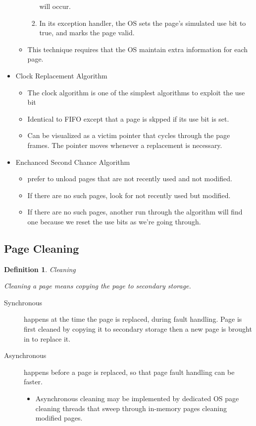 \documentclass[12pt]{article}
\newtheorem{defn}{Definition}[subsection]
\begin{document}
\begin{itemize}
\begin{itemize}
\begin{enumerate}
						will occur.
					\item In its exception handler, the OS sets the page's
						simulated use bit to true, and marks the page valid.
				\end{enumerate}
			\item This technique requires that the OS maintain extra information
				for each page.
		\end{itemize}
	\item Clock Replacement Algorithm
		\begin{itemize}
			\item The clock algorithm is one of the simplest algorithms to
				exploit the use bit
			\item Identical to FIFO except that a page is skpped if its use bit
				is set.
			\item Can be visualized as a victim pointer that cycles through the
				page frames. The pointer moves whenever a replacement is
				necessary.
		\end{itemize}
	\item Enchanced Second Chance Algorithm
		\begin{itemize}
			\item prefer to unload pages that are not recently used and not
				modified.
			\item If there are no such pages, look for not recently used but
				modified.
			\item If there are no such pages, another run through the algorithm
				will find one because we reset the use bits as we're going
				through.
		\end{itemize}
\end{itemize}

\subsection{Page Cleaning}

\begin{defn}{Cleaning}

	Cleaning a page means copying the page to secondary storage.

\end{defn}

\begin{description}
	\item[Synchronous] happens at the time the page is replaced, during fault
		handling. Page is first cleaned by copying it to secondary storage then
		a new page is brought in to replace it.
	\item[Asynchronous] happens before a page is replaced, so that page fault
		handling can be faster.
		\begin{itemize}
			\item Asynchronous cleaning may be implemented by dedicated OS page
				cleaning threads that sweep through in-memory pages cleaning
				modified pages.
		\end{itemize}
\end{description}
\end{document}
